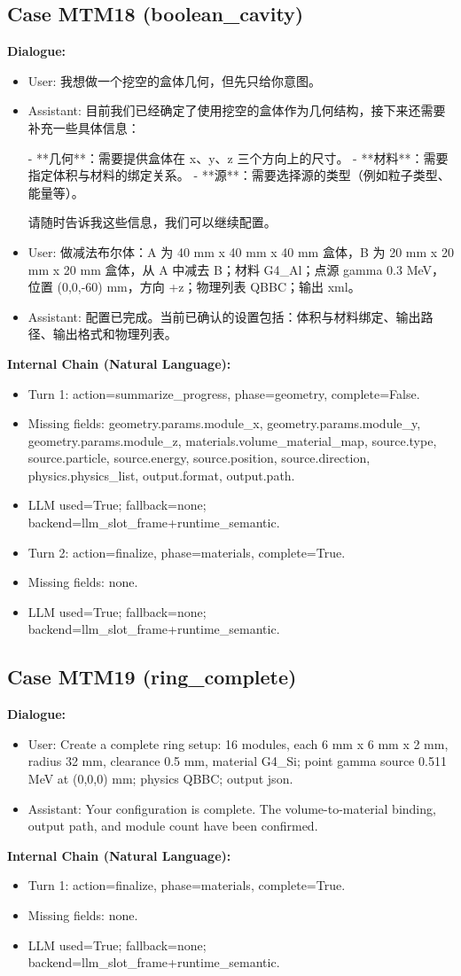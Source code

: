 \documentclass[11pt]{ctexart}
\begin{document}
\subsection{Case MTM18 (boolean\_cavity)}
\textbf{Dialogue:}
\begin{itemize}
\item User: 我想做一个挖空的盒体几何，但先只给你意图。
\item Assistant: 目前我们已经确定了使用挖空的盒体作为几何结构，接下来还需要补充一些具体信息：

- **几何**：需要提供盒体在 x、y、z 三个方向上的尺寸。
- **材料**：需要指定体积与材料的绑定关系。
- **源**：需要选择源的类型（例如粒子类型、能量等）。

请随时告诉我这些信息，我们可以继续配置。
\item User: 做减法布尔体：A 为 40 mm x 40 mm x 40 mm 盒体，B 为 20 mm x 20 mm x 20 mm 盒体，从 A 中减去 B；材料 G4\_Al；点源 gamma 0.3 MeV，位置 (0,0,-60) mm，方向 +z；物理列表 QBBC；输出 xml。
\item Assistant: 配置已完成。当前已确认的设置包括：体积与材料绑定、输出路径、输出格式和物理列表。
\end{itemize}
\textbf{Internal Chain (Natural Language):}
\begin{itemize}
\item Turn 1: action=summarize\_progress, phase=geometry, complete=False.
\item Missing fields: geometry.params.module\_x, geometry.params.module\_y, geometry.params.module\_z, materials.volume\_material\_map, source.type, source.particle, source.energy, source.position, source.direction, physics.physics\_list, output.format, output.path.
\item LLM used=True; fallback=none; backend=llm\_slot\_frame+runtime\_semantic.
\item Turn 2: action=finalize, phase=materials, complete=True.
\item Missing fields: none.
\item LLM used=True; fallback=none; backend=llm\_slot\_frame+runtime\_semantic.
\end{itemize}
\subsection{Case MTM19 (ring\_complete)}
\textbf{Dialogue:}
\begin{itemize}
\item User: Create a complete ring setup: 16 modules, each 6 mm x 6 mm x 2 mm, radius 32 mm, clearance 0.5 mm, material G4\_Si; point gamma source 0.511 MeV at (0,0,0) mm; physics QBBC; output json.
\item Assistant: Your configuration is complete. The volume-to-material binding, output path, and module count have been confirmed.
\end{itemize}
\textbf{Internal Chain (Natural Language):}
\begin{itemize}
\item Turn 1: action=finalize, phase=materials, complete=True.
\item Missing fields: none.
\item LLM used=True; fallback=none; backend=llm\_slot\_frame+runtime\_semantic.
\end{itemize}
\end{document}
